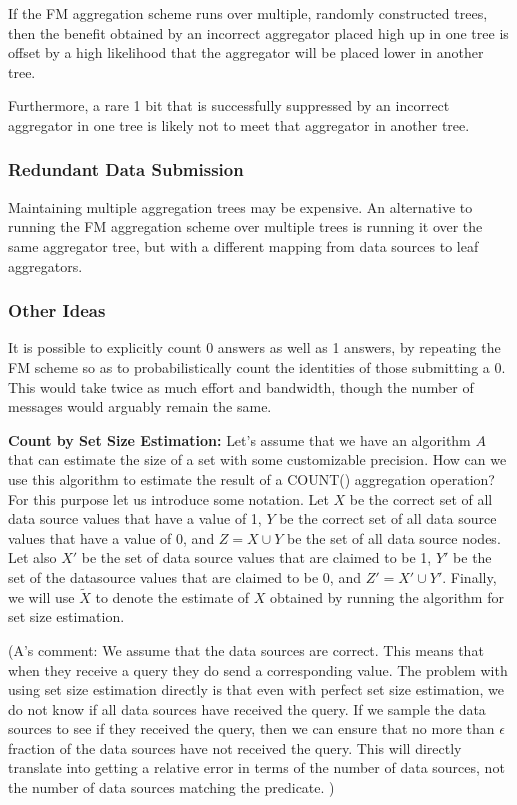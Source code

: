 \documentclass[11pt,twocolumn]{MyTightStyle}
\newcommand{\comm}[2]{{\color{blue} (#1's comment: #2)}}
\theoremstyle{plain}
\theoremstyle{definition}
\theoremstyle{remark}
\numberwithin{equation}{section}
\begin{document}
If the FM aggregation scheme runs over multiple, randomly constructed
trees, then the benefit obtained by an incorrect aggregator placed high up in
one tree is offset by a high likelihood that the aggregator will be
placed lower in another tree.

Furthermore, a rare 1 bit that is successfully suppressed by an
incorrect aggregator in one tree is likely not to meet that aggregator
in another tree.

\subsubsection{Redundant Data Submission}

Maintaining multiple aggregation trees may be expensive.  An alternative
to running the FM aggregation scheme over multiple trees is running it
over the same aggregator tree, but with a different mapping from data
sources to leaf aggregators.


\subsubsection{Other Ideas}

It is possible to explicitly count 0 answers as well as 1 answers, by
repeating the FM scheme so as to probabilistically count the identities
of those submitting a 0.  This would take twice as much effort and
bandwidth, though the number of messages would arguably remain the
same.  

{\bf Count by Set Size Estimation: } Let's assume that we have an
algorithm $A$ that can estimate the size of a set with some customizable
precision.  How can we use this algorithm to estimate the result of a
COUNT() aggregation operation? For this purpose let us introduce some
notation. Let $X$ be the correct set of all data source values that have
a value of 1, $Y$ be the correct set of all data source values that have
a value of 0, and $Z = X \cup Y$ be the set of all data source
nodes. Let also $X'$ be the set of data source values that are claimed
to be 1, $Y'$ be the set of the datasource values that are claimed to be
0, and $Z' = X' \cup Y'$. Finally, we will use $\widetilde{X}$ to denote
the estimate of $X$ obtained by running the algorithm for set size
estimation.

\comm{A}{We assume that the data sources are correct. This means that
          when they receive a query they do send a corresponding
          value. The problem with using set size estimation directly is
          that even with perfect set size estimation, we do not know if
          all data sources have received the query. If we sample the
          data sources to see if they received the query, then we can
          ensure that no more than $\epsilon$ fraction of the data
          sources have not received the query. This will directly
          translate into getting a relative error in terms of the number
          of data sources, not the number of data sources matching the
          predicate. }
\end{document}
